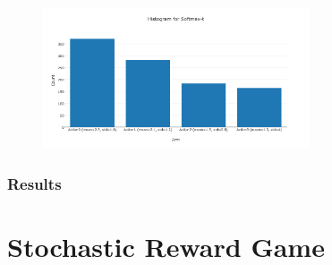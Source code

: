 \documentclass[11pt]{article}
\begin{document}
\begin{figure}[H]
   \centering
   \includegraphics[width=0.7\textwidth]{img/1-3/h2.png}
\end{figure}


\subsubsection{Results}


\section{Stochastic Reward Game}
\end{document}
